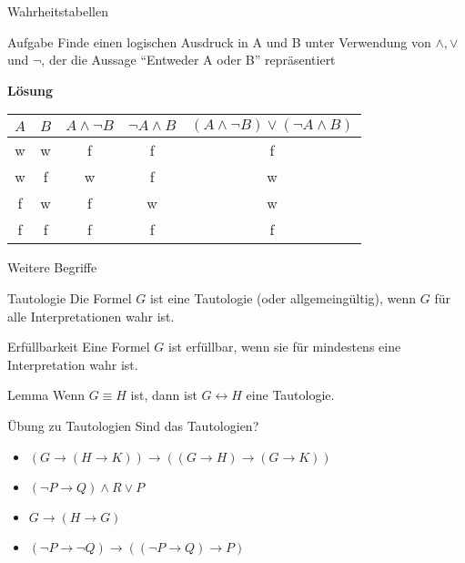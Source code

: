 \documentclass[handout]{beamer}
\begin{document}
\begin{frame}{Wahrheitstabellen}
	
	\begin{taskblock}{Aufgabe}
		Finde einen logischen Ausdruck in A und B unter Verwendung von $\land, \lor$ und $\lnot$, der die Aussage ``Entweder A oder B'' repräsentiert	
	\end{taskblock}

	\textbf{Lösung}
	\begin{center}
		\begin{tabular}{|c|c|c|c|c|}
			\hline
			$A$&$B$& $A \land \lnot B$& $\lnot A \land B$ & $(A \land \lnot B) \lor (\lnot A \land B) $\\
			\hline
			w&w&f&f&f\\
			w&f&w&f&w\\
			f&w&f&w&w\\
			f&f&f&f&f\\
			\hline
		\end{tabular}
	\end{center}
\end{frame}


\begin{frame}{Weitere Begriffe}\pause
	\begin{block}{Tautologie}\pause
		Die Formel $G$ ist eine Tautologie (oder allgemeingültig)\pause , wenn $G$ für alle Interpretationen wahr ist.
	\end{block}\pause
	\begin{block}{Erfüllbarkeit}\pause
		Eine Formel $G$ ist erfüllbar\pause , wenn sie für mindestens eine Interpretation wahr ist.
	\end{block}
	\pause
	\begin{block}{Lemma}
		Wenn $G\equiv H$ ist, dann ist $G \leftrightarrow H$ eine Tautologie.
	\end{block}
\end{frame}

\begin{frame} {Übung zu Tautologien}
Sind das Tautologien?
\begin{itemize}
	\item $(G \rightarrow (H \rightarrow K)) \rightarrow ((G \rightarrow H) \rightarrow (G \rightarrow K))$ \pause \hspace{0.3cm} 
	\item $(\lnot P \rightarrow Q) \land R \lor P$ \pause \hspace{0.3cm} 
	\item $G \rightarrow (H \rightarrow G)$ \pause \hspace{0.3cm} 
	\item $(\lnot P \rightarrow \lnot Q) \rightarrow ((\lnot P \rightarrow Q) \rightarrow P)$ \pause \hspace{0.3cm} 
\end{itemize}
\end{frame}
\end{document}
